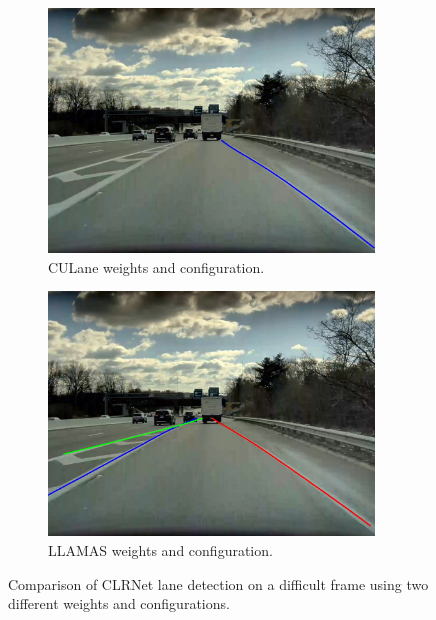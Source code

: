 \begin{figure}
  \centering
  \begin{subfigure}{0.9\linewidth}
    \centering
    \includegraphics[width=0.95\textwidth]{images/lanes_culane.jpg}
    \caption{CULane weights and configuration.}
  \end{subfigure}
  \begin{subfigure}{0.9\linewidth}
    \centering
    \includegraphics[width=0.95\textwidth]{images/lanes_llamas.jpg}
    \caption{LLAMAS weights and configuration.}
  \end{subfigure}
  \caption{Comparison of CLRNet lane detection on a difficult frame using two different weights and configurations.}
  \label{fig:lane_detection}
\end{figure}

